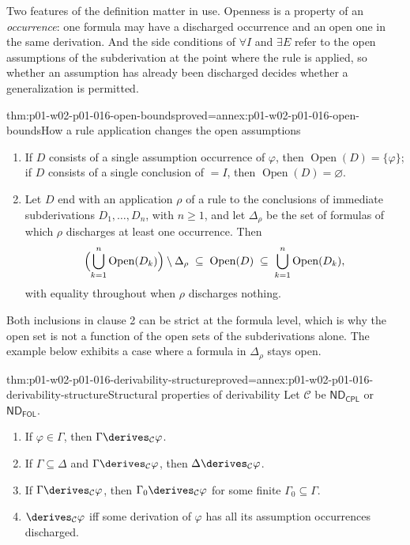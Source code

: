 Two features of the definition matter in use. Openness is a property of an
\emph{occurrence}: one formula may have a discharged occurrence and an open
one in the same derivation. And the side conditions of \(\forall I\) and
\(\exists E\) refer to the open assumptions of the subderivation at the point
where the rule is applied, so whether an assumption has already been
discharged decides whether a generalization is permitted.

\begin{hblemma}{thm:p01-w02-p01-016-open-bounds}{proved=annex:p01-w02-p01-016-open-bounds}{How a rule application changes the open assumptions}
\leavevmode
\begin{enumerate}
  \item If \(D\) consists of a single assumption occurrence of \(\varphi\),
        then \(\operatorname{Open}(D)=\{\varphi\}\); if \(D\) consists of a
        single conclusion of \(=I\), then \(\operatorname{Open}(D)=\varnothing\).
  \item Let \(D\) end with an application \(\rho\) of a rule to the
        conclusions of immediate subderivations \(D_1,\ldots,D_n\), with
        \(n\ge1\), and let \(\Delta_\rho\) be the set of formulas of which
        \(\rho\) discharges at least one occurrence. Then
        \[
          \Bigl(\bigcup_{k=1}^{n}\operatorname{Open}(D_k)\Bigr)
          \setminus\Delta_\rho
          \;\subseteq\;
          \operatorname{Open}(D)
          \;\subseteq\;
          \bigcup_{k=1}^{n}\operatorname{Open}(D_k),
        \]
        with equality throughout when \(\rho\) discharges nothing.
\end{enumerate}
\end{hblemma}

Both inclusions in clause 2 can be strict at the formula level, which is why
the open set is not a function of the open sets of the subderivations alone.
The example below exhibits a case where a formula in \(\Delta_\rho\) stays
open.

\begin{hbtheorem}{thm:p01-w02-p01-016-derivability-structure}{proved=annex:p01-w02-p01-016-derivability-structure}{Structural properties of derivability}
Let \(\mathcal C\) be \(\mathsf{ND}_{\mathsf{CPL}}\) or
\(\mathsf{ND}_{\mathsf{FOL}}\).
\begin{enumerate}
  \item If \(\varphi\in\Gamma\), then \(\Gamma\derives_{\mathcal C}\varphi\).
  \item If \(\Gamma\subseteq\Delta\) and \(\Gamma\derives_{\mathcal C}\varphi\),
        then \(\Delta\derives_{\mathcal C}\varphi\).
  \item If \(\Gamma\derives_{\mathcal C}\varphi\), then
        \(\Gamma_0\derives_{\mathcal C}\varphi\) for some finite
        \(\Gamma_0\subseteq\Gamma\).
  \item \(\derives_{\mathcal C}\varphi\) iff some derivation of \(\varphi\)
        has all its assumption occurrences discharged.
\end{enumerate}
\end{hbtheorem}

